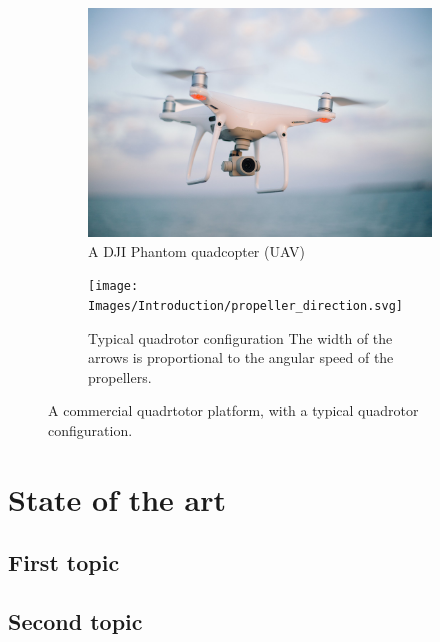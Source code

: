 \documentclass{thesisreport}
\begin{document}
\begin{figure}[h]
     \centering
     \begin{subfigure}[b]{0.45\textwidth}
         \centering
         \includegraphics[width=\textwidth]{Images/Introduction/drone}
    \caption{A DJI Phantom quadcopter (UAV)}
         \label{fig:drone}
     \end{subfigure}
     \hfill
     \begin{subfigure}[b]{0.45\textwidth}
         \centering
         \texttt{[image: Images/Introduction/propeller\_direction.svg]}
         \caption{Typical quadrotor configuration The width of the arrows is proportional to the angular speed of the propellers. \cite{Bouabdalla2007}}
         \label{fig:propeller_directions}
     \end{subfigure}
        \caption{A commercial quadrtotor platform, with a typical quadrotor configuration.}
        \label{fig:three graphs}
\end{figure}











 \chapter{State of the art}
 
 \section{First topic}
 
 \section{Second topic}
 
\end{document}
